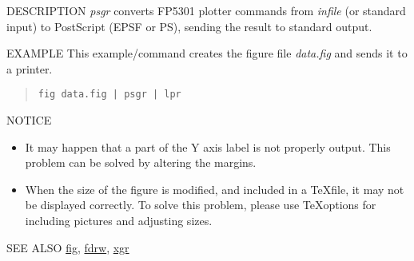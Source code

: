 \begin{synopsis}
 \item[psgr] [ --t {\em title} ] [ --s $S$ ] [ --c $C$ ] [ --x $X$ ]
[ --y $Y$ ] [ --p P ] [ --r $R$ ] [ --b ] 
\item[\ ~~~~~][ --T $T$ ] [ --B $B$ ]
[ --L $L$ ] [ --R $R$ ] [ --P ] [ {\em infile} ]
\end{synopsis}

\begin{qsection}{DESCRIPTION}
{\em psgr} converts FP5301 plotter commands 
from {\em infile} (or standard input) to PostScript (EPSF or PS), 
sending the result to standard output.
\end{qsection}

\begin{options}
\end{options}

\begin{qsection}{EXAMPLE}
This example/command creates the figure file {\em data.fig}
 and sends it to a printer.
\begin{quote}
 \verb!fig data.fig | psgr | lpr!
\end{quote}
\end{qsection}

\begin{qsection}{NOTICE}
\begin{itemize}
\item It may happen that a part of the Y axis label
      is not properly output.
      This problem can be solved by altering the margins.
\item When the size of the figure is modified,
      and included in a \TeX file, it may not be displayed correctly.
      To solve this problem, please use \TeX options for including
      pictures and adjusting sizes.
\end{itemize}
\end{qsection}

\begin{qsection}{SEE ALSO}
\hyperlink{fig}{fig},
\hyperlink{fdrw}{fdrw},
\hyperlink{xgr}{xgr}
\end{qsection}

